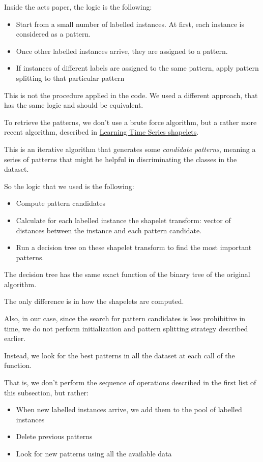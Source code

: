 Inside the acts paper, the logic is the following:
\begin{itemize}
    \item Start from a small number of labelled instances. At first, each instance is considered 
    as a pattern.
    \item Once other labelled instances arrive, they are assigned to a pattern.
    \item If instances of different labels are assigned to the same pattern, apply 
    pattern splitting to that particular pattern 
\end{itemize}

This is not the procedure applied in the code. We used a different approach, that has 
the same logic and should be equivalent.

To retrieve the patterns, we don't use a brute force algorithm, but a rather more recent 
algorithm, described in \href{https://www.ismll.uni-hildesheim.de/pub/pdfs/grabocka2014e-kdd.pdf}{Learning
Time Series shapelets}.

This is an iterative algorithm that generates some \textit{candidate patterns}, 
meaning a series of patterns that might be helpful in discriminating the classes in the dataset.

So the logic that we used is the following:
\begin{itemize}
    \item Compute pattern candidates 
    \item Calculate for each labelled instance the shapelet transform: vector of distances between the instance and 
    each pattern candidate.
    \item Run a decision tree on these shapelet transform to find the most important patterns.
\end{itemize}

The decision tree has the same exact function of the binary tree of the original algorithm. 

The only difference is in how the shapelets are computed.

Also, in our case, since the search for pattern candidates is less prohibitive in time, we do not 
perform initialization and pattern splitting strategy described earlier.

Instead, we look for the best patterns in all the dataset at each call of the function.

That is, we don't perform the sequence of operations described in the first list of this subsection, but rather:
\begin{itemize}
    \item When new labelled instances arrive, we add them to the pool of labelled instances
    \item Delete previous patterns 
    \item Look for new patterns using all the available data 
\end{itemize}



